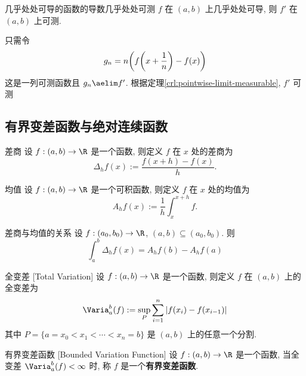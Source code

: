 \begin{thm}
    {几乎处处可导的函数的导数几乎处处可测}
    \(f\) 在 \((a,b)\) 上几乎处处可导, 则 \(f'\) 在 \((a,b)\) 上可测.
\end{thm}
\begin{prf}
    只需令
    \[g_n=n\qty(f\qty(x+\frac{1}{n})-f(x))\]
    这是一列可测函数且 \(g_n\aelim f'\). 根据定理\ref{crl:pointwise-limit-measurable}, \(f'\) 可测
\end{prf}
\subsection{有界变差函数与绝对连续函数}
\begin{dfn}
    {差商}
    设 \(f:(a,b)\to\R\) 是一个函数, 则定义 \(f\) 在 \(x\) 处的差商为
    \[
    \Delta_h f(x) := \frac{f(x+h) - f(x)}{h}.
    \]
\end{dfn}
\begin{dfn}
    {均值}
    设 \(f:(a,b)\to\R\) 是一个可积函数, 则定义 \(f\) 在 \(x\) 处的均值为
    \[
    A_h f(x) := \frac{1}{h} \int_x^{x+h} f.
    \]
\end{dfn}
\begin{ppt}
    {差商与均值的关系}
    设 \(f:(a_0,b_0)\to\R\), \((a,b)\subseteq (a_0,b_0)\). 则 
    \[\int_a^b \Delta_h f(x) =  A_h f(b) - A_h f(a) \]
\end{ppt}

\begin{dfn}
    {全变差}
    [Total Variation]
    设 \(f:(a,b)\to\R\) 是一个函数, 则定义 \(f\) 在 \((a,b)\) 上的全变差为
    \[\Varia_a^b(f) := \sup_{P} \sum_{i=1}^n |f(x_i) - f(x_{i-1})|\]
    其中 \(P = \{a = x_0 < x_1 < \cdots < x_n = b\}\) 是 \((a,b)\) 上的任意一个分割.
\end{dfn}
\begin{dfn}
    {有界变差函数}
    [Bounded Variation Function]
    设 \(f:(a,b)\to\R\) 是一个函数, 当全变差 \(\Varia_a^b(f) < \infty\) 时, 称 \(f\) 是一个\textbf{有界变差函数}.
\end{dfn}
